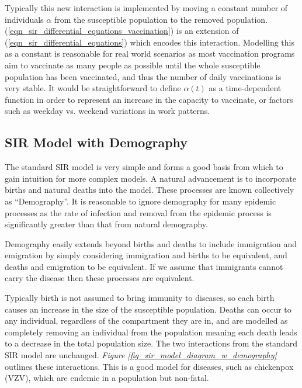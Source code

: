 \documentclass[11pt,a4paper]{article}
\theoremstyle{break}
\begin{document}
  \par Typically this new interaction is implemented by moving a constant number of individuals $\alpha$ from the susceptible population to the removed population. (\ref{eqn_sir_differential_equations_vaccination}) is an extension of (\ref{eqn_sir_differential_equations}) which encodes this interaction. Modelling this as a constant is reasonable for real world scenarios as most vaccination programs aim to vaccinate as many people as possible until the whole susceptible population has been vaccinated, and thus the number of daily vaccinations is very stable. It would be straightforward to define $\alpha(t)$ as a time-dependent function in order to represent an increase in the capacity to vaccinate, or factors such as weekday vs. weekend variations in work patterns.

\subsection*{SIR Model with Demography}

  \par The standard SIR model is very simple and forms a good basis from which to gain intuition for more complex models. A natural advancement is to incorporate births and natural deaths into the model. These processes are known collectively as ``Demography''. It is reasonable to ignore demography for many epidemic processes as the rate of infection and removal from the epidemic process is significantly greater than that from natural demography.

  \par Demography easily extends beyond births and deaths to include immigration and emigration by simply considering immigration and births to be equivalent, and deaths and emigration to be equivalent. If we assume that immigrants cannot carry the disease then these processes are equivalent.

  \par Typically birth is not assumed to bring immunity to diseases, so each birth causes an increase in the size of the susceptible population. Deaths can occur to any individual, regardless of the compartment they are in, and are modelled as completely removing an individual from the population meaning each death leads to a decrease in the total population size. The two interactions from the standard SIR model are unchanged. \textit{Figure \ref{fig_sir_model_diagram_w_demography}} outlines these interactions. This is a good model for diseases, such as chickenpox (VZV), which are endemic in a population but non-fatal.
\end{document}
